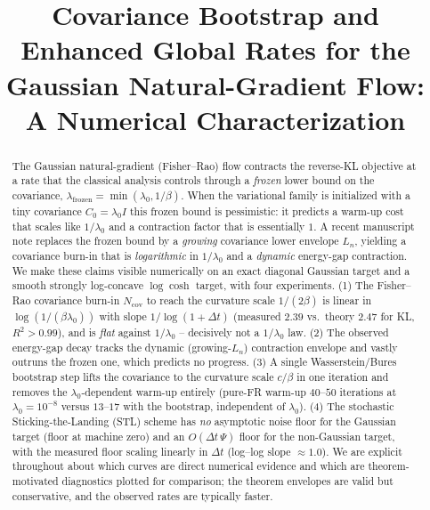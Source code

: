 \documentclass[11pt]{article}
\title{Covariance Bootstrap and Enhanced Global Rates for the\\
Gaussian Natural-Gradient Flow:\\
A Numerical Characterization}
\author{}
\date{}
\newcommand{\Delt}{\Delta t}
\newcommand{\Ncov}{N_{\mathrm{cov}}}
\begin{document}
\maketitle

\begin{abstract}
The Gaussian natural-gradient (Fisher--Rao) flow contracts the reverse-KL
objective at a rate that the classical analysis controls through a \emph{frozen}
lower bound on the covariance, $\lambda_{\mathrm{frozen}}=\min(\lambda_0,1/\beta)$.
When the variational family is initialized with a tiny covariance
$C_0=\lambda_0 I$ this frozen bound is pessimistic: it predicts a warm-up cost
that scales like $1/\lambda_0$ and a contraction factor that is essentially $1$.
A recent manuscript note replaces the frozen bound by a \emph{growing} covariance
lower envelope $L_n$, yielding a covariance burn-in that is \emph{logarithmic} in
$1/\lambda_0$ and a \emph{dynamic} energy-gap contraction. We make these claims
visible numerically on an exact diagonal Gaussian target and a smooth strongly
log-concave $\log\cosh$ target, with four experiments. (1) The Fisher--Rao
covariance burn-in $\Ncov$ to reach the curvature scale $1/(2\beta)$ is linear in
$\log(1/(\beta\lambda_0))$ with slope $1/\log(1+\Delt)$ (measured $2.39$ vs.\
theory $2.47$ for KL, $R^2>0.99$), and is \emph{flat} against $1/\lambda_0$ --
decisively not a $1/\lambda_0$ law. (2) The observed energy-gap decay tracks the
dynamic (growing-$L_n$) contraction envelope and vastly outruns the frozen one,
which predicts no progress. (3) A single Wasserstein/Bures bootstrap step lifts
the covariance to the curvature scale $c/\beta$ in one iteration and removes the
$\lambda_0$-dependent warm-up entirely (pure-FR warm-up $40$--$50$ iterations at
$\lambda_0=10^{-8}$ versus $13$--$17$ with the bootstrap, independent of
$\lambda_0$). (4) The stochastic Sticking-the-Landing (STL) scheme has \emph{no}
asymptotic noise floor for the Gaussian target (floor at machine zero) and an
$O(\Delt\,\Psi)$ floor for the non-Gaussian target, with the measured floor
scaling linearly in $\Delt$ (log--log slope $\approx1.0$). We are explicit
throughout about which curves are direct numerical evidence and which are
theorem-motivated diagnostics plotted for comparison; the theorem envelopes are
valid but conservative, and the observed rates are typically faster.
\end{abstract}

\tableofcontents

\end{document}
